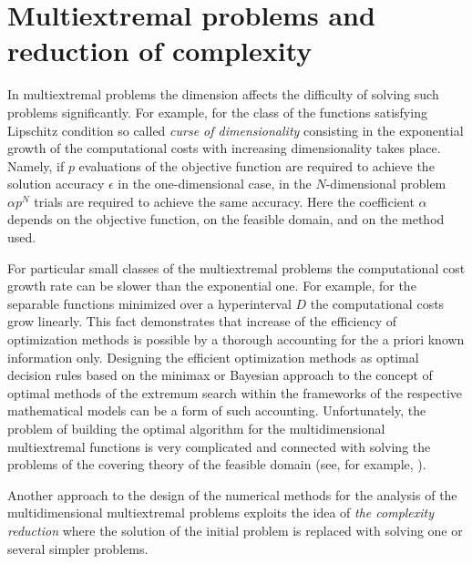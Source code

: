 \section{Multiextremal problems and reduction of complexity}
\label{sec:1_3}
In multiextremal problems the dimension affects the difficulty of solving such problems significantly. For example, for the class of the functions satisfying Lipschitz condition so called  \textit{curse of dimensionality} consisting in the exponential growth of the computational costs with increasing dimensionality takes place. Namely, if $p$ evaluations of the objective function are required to achieve the solution accuracy $\epsilon$ in the one-dimensional case, in the $N$-dimensional problem $\alpha p^N$  trials are required to achieve the same accuracy. Here the coefficient $\alpha$ depends on the objective function, on the feasible domain, and on the method used. 

For particular small classes of the multiextremal problems the computational cost growth rate can be slower than the exponential one. For example, for the separable functions minimized over a hyperinterval $D$ the computational costs grow linearly. This fact demonstrates that increase of the efficiency of optimization methods is possible by a thorough accounting for the a priori known information only. Designing the efficient optimization methods as optimal decision rules based on the minimax or Bayesian approach to the concept of optimal methods of the extremum search within the frameworks of the respective mathematical models can be a form of such accounting. Unfortunately, the problem of building the optimal algorithm for the multidimensional multiextremal functions is  very complicated and connected with solving the problems of the covering theory of the feasible domain (see, for example, \cite{1_Sukharev1971, 1_Sukharev1972, 1_Sukharev1989}).

Another approach to the design of the numerical methods for the analysis of the multidimensional multiextremal problems exploits the idea of \textit{the complexity reduction} where the solution of the initial problem is replaced with solving one or several simpler problems.

